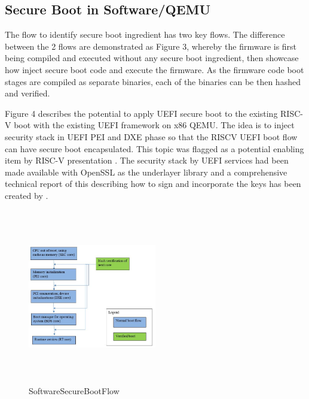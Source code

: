 \documentclass[a4paper,fleqn]{cas-dc}
\begin{document}

\subsection{ Secure Boot in Software/QEMU}
The flow to identify secure boot ingredient has two key flows. The difference between the 2 flows are demonstrated as Figure 3, whereby the firmware is first being compiled and executed without any secure boot ingredient, then showcase how inject secure boot code and execute the firmware. As the firmware code boot stages are compiled as separate binaries, each of the binaries can be then hashed and verified.

Figure 4 describes the potential to apply UEFI secure boot to the existing RISC-V boot with the existing UEFI framework on x86 QEMU. The idea is to inject security stack in UEFI PEI and DXE phase so that the RISCV UEFI boot flow can have secure boot encapsulated. This topic was flagged as a potential enabling item by RISC-V presentation \cite{R5:10}. The security stack by UEFI services had been made available with OpenSSL as the underlayer library and a comprehensive technical report of this describing how to sign and incorporate the keys has been created by \cite{R5:11}.

\begin{figure}[hbt!]
	\centering
	\includegraphics[width=0.5\textwidth,height=3in]{figs/SoftwareSecureBootFlow.JPG}
	\caption{SoftwareSecureBootFlow}
\end{figure}
\end{document}
